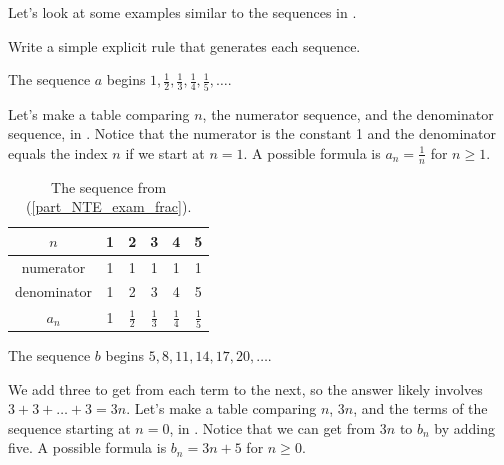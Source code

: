 Let's look at some examples similar to the sequences in .

\begin{exam}
\label{exam_next_term_explicit}
        Write a simple explicit rule that generates each sequence.  
            \begin{apart}
            \item \label{part_NTE_exam_frac} The sequence $a$ begins $1, \frac{1}{2}, \frac{1}{3},\frac{1}{4},\frac{1}{5},\ldots$. 
                \begin{soln}
                    Let's make a table comparing $n$, the numerator sequence, and the denominator sequence, in . Notice that the numerator is the constant 1 and the denominator equals the index $n$ if we start at $n=1$.  A possible formula is $a_n = \frac{1}{n}$ for $n \ge 1$. 
                \end{soln}

                \begin{table}[hbtp]
                    \centering
                    \begin{tabular}{c|c|c |c|c|c}
                        $n$ & 1 & 2 & 3 & 4 & 5  \\ \hline
                        numerator & 1 & 1 & 1 & 1 & 1 \\ \hline
                        denominator & 1 & 2 & 3 & 4 & 5 \\ \hline
                        $a_n$ & 1 & $\frac{1}{2}$ & $\frac{1}{3}$ & $\frac{1}{4}$ & $\frac{1}{5}$\\
                    \end{tabular}
                    \caption{The sequence from  (\ref{part_NTE_exam_frac}).}
                    \label{tab_NTE_exam_frac}
                \end{table}
                
            \item \label{part_NTE_exam_linear} The sequence $b$ begins $5,8,11,14,17,20,\ldots$. 
                \begin{soln}
                    We add three to get from each term to the next, so the answer likely involves $3+3+\ldots +3 = 3n$.  Let's make a table comparing $n$, $3n$, and the terms of the sequence starting at $n=0$, in . Notice that we can get from $3n$ to $b_n$ by adding five. A possible formula is $b_n = 3n+5$ for $n \ge 0$.
                \end{soln}


\end{apart}
\end{exam}
